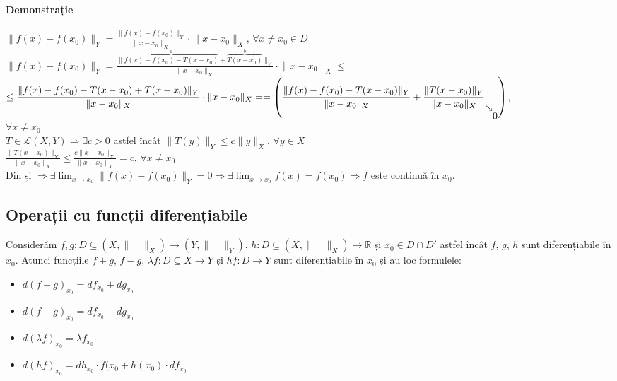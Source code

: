 \paragraph{Demonstrație}
$\lVert f(x) - f(x_{0}) \rVert_{Y} = \displaystyle\frac{\lVert f(x) - f(x_{0}) \rVert_{Y}}{\lVert x - x_{0} \rVert_{X}} \cdot \lVert x - x_{0} \rVert_{X}$, $\forall x \neq x_{0} \in D$ \\
$\lVert f(x) - f(x_{0}) \rVert_{Y} = \displaystyle\frac{\lVert \overbrace{f(x) - f(x_{0}) - T(x - x_{0})}^{a} + \overbrace{T(x - x_{0})}^{b} \rVert_{Y}}{\lVert x - x_{0} \rVert_{X}} \cdot 
\lVert x - x_{0} \rVert_{X} \leq$ \\[5mm]
$\leq \displaystyle\frac{\lVert f(x) - f(x_{0}) - T(x - x_{0}) + T(x -
x_{0}) \rVert_{Y}}{\lVert x - x_{0} \rVert_{X}} \cdot \lVert x - x_{0}
\rVert_{X} = \\[5mm]
= \left(\displaystyle\frac{\lVert f(x) - f(x_{0}) - T(x - x_{0}) \rVert_{Y}}{\lVert x - x_{0} \rVert_{X}} + \displaystyle\frac{\lVert T(x - x_{0}) \rVert_{Y}}{\lVert x - x_{0} \rVert_{X}}
_{\searrow \raisebox{-2.2ex}{0}} \right)$, \\[10mm]
$\forall x \neq x_{0}$  \\
$T \in \mathcal{L}(X, Y) \Rightarrow \exists c > 0$ astfel încât $\lVert T(y) \rVert_{Y} \leq c\lVert y \rVert_{X}$, $\forall y \in X$ \\
$\displaystyle\frac{\lVert T(x - x_{0}) \rVert_{Y}}{\lVert x - x_{0} \rVert_{X}} \leq \displaystyle\frac{c \lVert x - x_{0} \rVert_{X}}{\lVert x - x_{0} \rVert_{X}} = c$, $\forall x \neq x_{0}$
\vspace{8mm}
\\
Din  și  $\Rightarrow \exists \displaystyle\lim_{x \rightarrow x_{0}} \lVert f(x) - f(x_{0}) \rVert_{Y} = 0 \Rightarrow \exists \displaystyle\lim_{x \rightarrow x_{0}} f(x) = f(x_{0})
\Rightarrow f$ este continuă în $x_{0}$.

\subsection*{Operații cu funcții diferențiabile}
Considerăm $f, g:D \subseteq (X, \lVert \quad \rVert_{X}) \rightarrow (Y, \lVert \quad \rVert_{Y})$, $h:D \subseteq (X, \lVert \quad \rVert_{X}) \rightarrow \mathbb{R}$ și $x_{0} \in D \cap D'$
astfel încât $f$, $g$, $h$ sunt diferențiabile în $x_{0}$. Atunci funcțiile $f+g$, $f-g$, $\lambda f:D \subseteq X \rightarrow Y$ și $hf: D \rightarrow Y$ sunt diferențiabile în $x_{0}$ 
și au loc formulele:
\begin{itemize}
	\item $d(f+g)_{x_{0}} = df_{x_{0}} + dg_{x_{0}}$
	\item $d(f-g)_{x_{0}} = df_{x_{0}} - dg_{x_{0}}$
	\item $d(\lambda f)_{x_{0}} = \lambda f_{x_{0}}$
	\item $d(hf)_{x_{0}} = dh_{x_{0}} \cdot f(x_{0} + h(x_{0}) \cdot df_{x_{0}}$
\end{itemize}


